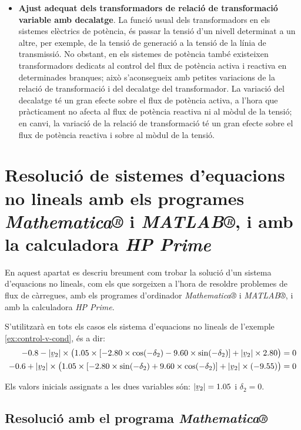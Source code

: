 \begin{itemize}
   \item \textbf{Ajust adequat dels transformadors de relació de transformació variable amb
    decalatge}. La funció usual dels transformadors en els sistemes elèctrics de potència,
    és passar la tensió d'un nivell determinat a un altre, per exemple, de la tensió de generació
    a la tensió de la línia de transmissió. No obstant, en els sistemes de potència també existeixen
    transformadors dedicats al control del flux de potència activa i reactiva en determinades
    branques; això s'aconsegueix amb petites variacions de la relació de transformació i del
    decalatge del transformador. La variació del decalatge té un gran efecte sobre el flux
    de potència activa, a l'hora que pràcticament no afecta al flux de potència reactiva ni al
    mòdul de la tensió; en canvi, la variació de la relació de transformació té un gran efecte
    sobre el flux de potència reactiva i sobre al mòdul de la tensió.
\end{itemize}

\section{Resolució de sistemes d'equacions no lineals amb els programes \emph{Mathematica®} i
\emph{MATLAB®},  i amb la calculadora \emph{HP Prime}}
\label{sec:sis_eq_no_lin}


En aquest apartat es descriu breument com trobar la solució d'un sistema d'equacions no lineals, com els que sorgeixen a l'hora de resoldre problemes de flux de càrregues, amb els programes d'ordinador \emph{Mathematica®} i \emph{MATLAB®}, i amb la calculadora \emph{HP Prime}.

S'utilitzarà en tots els casos els sistema d'equacions no lineals de l'exemple \vref{ex:control-v-cond}, és a dir:
\begin{align*}
\num{-0,8} - |\cmplx{v}_2| \times \bigl( \num{1,05}\times [\num{-2,80}\times \cos(-\delta_2) - \num{9,60} \times
\sin( -\delta_2)]  + |\cmplx{v}_2| \times \num{2,80} \bigr) &= 0 \\
-\num{0,6} + |\cmplx{v}_2| \times\bigl( \num{1,05} \times[\num{-2,80}\times\sin(-\delta_2) +
\num{9,60}\times\cos( -\delta_2)]  + |\cmplx{v}_2|\times (\num{-9,55}) \bigr) &= 0
\end{align*}

Els valors inicials assignats a les dues variables són: $|\cmplx{v}_2|=\num{1,05}$ i $\delta_2=0$.

\subsection{Resolució amb el programa \emph{Mathematica®}}

